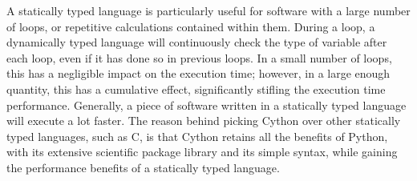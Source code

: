 A statically typed language is particularly useful for software with a large number of loops, or repetitive calculations contained within them. During a loop, a dynamically typed language will continuously check the type of variable after each loop, even if it has done so in previous loops. In a small number of loops, this has a negligible impact on the execution time; however, in a large enough quantity, this has a cumulative effect, significantly stifling the execution time performance. Generally, a piece of software written in a statically typed language will execute a lot faster. The reason behind picking Cython over other statically typed languages, such as C, is that Cython retains all the benefits of Python, with its extensive scientific package library and its simple syntax, while gaining the performance benefits of a statically typed language.

